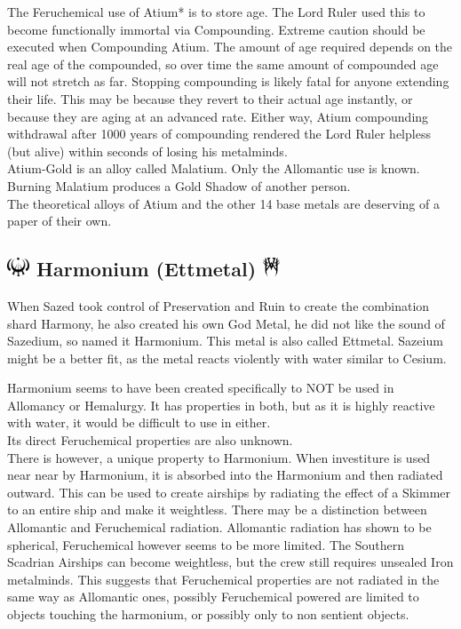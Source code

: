 \documentclass[conference]{IEEEtran}
\begin{document}
The Feruchemical use of Atium* is to store age.  The Lord Ruler used this to become functionally immortal via Compounding.  Extreme caution should be executed when Compounding Atium.  The amount of age required depends on the real age of the compounded, so over time the same amount of compounded age will not stretch as far.  Stopping compounding is likely fatal for anyone extending their life.  This may be because they revert to their actual age instantly, or because they are aging at an advanced rate.  Either way, Atium compounding withdrawal after 1000 years of compounding rendered the Lord Ruler helpless (but alive) within seconds of losing his metalminds.\\

Atium-Gold is an alloy called Malatium.
Only the Allomantic use is known.  Burning Malatium produces a Gold Shadow of another person.\\

The theoretical alloys of Atium and the other 14 base metals are deserving of a paper of their own.


\subsection*{\includegraphics[height=1em]{images/Ettmetal.png}  Harmonium (Ettmetal) \includegraphics[height=1em]{images/Ettmetal_(Feruchemy).png}}
When Sazed took control of Preservation and Ruin to create the combination shard Harmony, he also created his own God Metal, he did not like the sound of Sazedium, so named it Harmonium.  This metal is also called Ettmetal. Sazeium might be a better fit, as the metal reacts violently with water similar to Cesium.

Harmonium seems to have been created specifically to NOT be used in Allomancy or Hemalurgy.  It has properties in both, but as it is highly reactive with water, it would be difficult to use in either.\\

Its direct Feruchemical properties are also unknown.\\

There is however, a unique property to Harmonium.  When investiture is used near near by Harmonium, it is absorbed into the Harmonium and then radiated outward.  This can be used to create airships by radiating the effect of a Skimmer to an entire ship and make it weightless.  There may be a distinction between Allomantic and Feruchemical radiation.  Allomantic radiation has shown to be spherical, Feruchemical however seems to be more limited.  The Southern Scadrian Airships can become weightless, but the crew still requires unsealed Iron metalminds.  This suggests that Feruchemical properties are not radiated in the same way as Allomantic ones, possibly Feruchemical powered are limited to objects touching the harmonium, or possibly only to non sentient objects.
\end{document}
